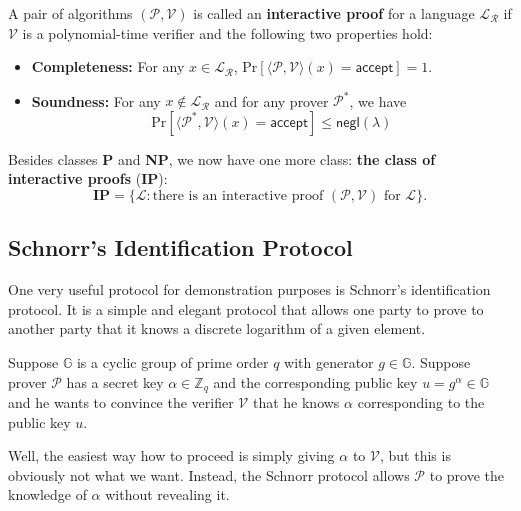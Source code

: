 \documentclass[../lecture-notes.tex]{subfiles}
\begin{document}
\begin{definition}
    A pair of algorithms $(\mathcal{P},\mathcal{V})$ is called an \textbf{interactive proof} for a language $\mathcal{L}_{\mathcal{R}}$ if $\mathcal{V}$ is a polynomial-time verifier and the following two properties hold:
    \begin{itemize}
        \item \textbf{Completeness:} For any $x \in \mathcal{L}_{\mathcal{R}}$, $\text{Pr}[\langle \mathcal{P}, \mathcal{V} \rangle(x) = \mathsf{accept}]=1$.
        \item \textbf{Soundness:} For any $x \not\in \mathcal{L}_{\mathcal{R}}$ and for any prover $\mathcal{P}^*$, we have 
        \begin{equation*}
            \text{Pr}[\langle \mathcal{P}^*, \mathcal{V} \rangle(x) = \mathsf{accept}] \leq \mathsf{negl}(\lambda)
        \end{equation*}
    \end{itemize}
\end{definition}

\begin{definition}
    Besides classes \textbf{P} and \textbf{NP}, we now have one more class: \textbf{the class of interactive proofs} (\textbf{IP}):
    \begin{equation*}
        \mathbf{IP} = \{\mathcal{L}: \text{there is an interactive proof $(\mathcal{P}, \mathcal{V})$ for $\mathcal{L}$}\}.
    \end{equation*}
\end{definition}

\subsection{Schnorr's Identification Protocol}

One very useful protocol for demonstration purposes is Schnorr's identification protocol. It is a simple and elegant protocol that allows one party to prove to another party that it knows a discrete logarithm of a given element. 

Suppose $\mathbb{G}$ is a cyclic group of prime order $q$ with generator $g \in \mathbb{G}$. Suppose prover $\mathcal{P}$ has a secret key $\alpha \in \mathbb{Z}_q$ and the corresponding public key $u = g^{\alpha} \in \mathbb{G}$ and he wants to convince the verifier $\mathcal{V}$ that he knows $\alpha$ corresponding to the public key $u$. 

Well, the easiest way how to proceed is simply giving $\alpha$ to $\mathcal{V}$, but this is obviously not what we want. Instead, the Schnorr protocol allows $\mathcal{P}$ to prove the knowledge of $\alpha$ without revealing it. 
\end{document}

